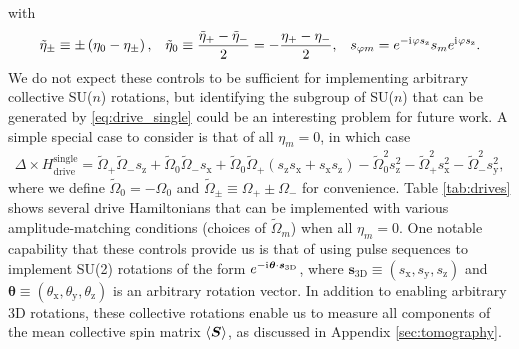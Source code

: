 \documentclass[nofootinbib,notitlepage,11pt]{revtex4-2}
\renewcommand{\t}{\text} %
\newcommand{\f}[2]{\dfrac{#1}{#2}} %
\newcommand{\p}[1]{\left(#1\right)} %
\newcommand{\bk}{\Braket} %
\renewcommand{\v}{\bm} %
\renewcommand{\c}{\cdot} %
\renewcommand{\i}{\mathrm{i}\mkern1mu} %
\newcommand{\1}{\mathds{1}}
\newcommand{\x}{\text{x}}
\newcommand{\y}{\text{y}}
\newcommand{\z}{\text{z}}
\begin{document}
with
\begin{align}
  \tilde\eta_\pm \equiv \pm\p{\eta_0 - \eta_\pm},
  &&
  \tilde\eta_0 \equiv \f{\tilde\eta_+ - \tilde\eta_-}{2}
  = -\f{\eta_+ - \eta_-}{2},
  &&
  s_{\varphi m} = e^{-\i\varphi s_\z} s_m e^{\i\varphi s_\z}.
\end{align}
We do not expect these controls to be sufficient for implementing arbitrary collective SU($n$) rotations, but identifying the subgroup of SU($n$) that can be generated by \eqref{eq:drive_single} could be an interesting problem for future work.
A simple special case to consider is that of all $\eta_m=0$, in which case
\begin{align}
  \Delta \times H_{\t{drive}}^{\t{single}}
  = \tilde\Omega_+ \tilde\Omega_- s_\z
  + \tilde\Omega_0 \tilde\Omega_- s_\x
  + \tilde\Omega_0 \tilde\Omega_+ \p{s_\z s_\x  + s_\x s_\z}
  - \tilde\Omega_0^2 s_\z^2 - \tilde\Omega_+^2 s_\x^2
  - \tilde\Omega_-^2 s_\y^2,
\end{align}
where we define $\tilde\Omega_0=-\Omega_0$ and $\tilde\Omega_\pm\equiv\Omega_+\pm\Omega_-$ for convenience.
Table \ref{tab:drives} shows several drive Hamiltonians that can be implemented with various amplitude-matching conditions (choices of $\tilde\Omega_m$) when all $\eta_m=0$.
One notable capability that these controls provide us is that of using pulse sequences to implement SU(2) rotations of the form $e^{-\i\v\theta\c\v s_{\t{3D}}}$, where $\v s_{\t{3D}}\equiv\p{s_\x,s_\y,s_\z}$ and $\v\theta\equiv\p{\theta_\x,\theta_\y,\theta_\z}$ is an arbitrary rotation vector.
In addition to enabling arbitrary 3D rotations, these collective rotations enable us to measure all components of the mean collective spin matrix $\bk{\v S}$, as discussed in Appendix \ref{sec:tomography}.
\end{document}
